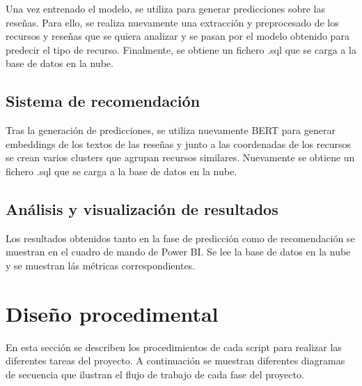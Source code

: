 Una vez entrenado el modelo, se utiliza para generar predicciones sobre las reseñas.
Para ello, se realiza nuevamente una extracción y preprocesado de los recursos y reseñas que se quiera analizar y se pasan por el modelo obtenido para predecir el tipo de recurso.
Finalmente, se obtiene un fichero .sql que se carga a la base de datos en la nube.

\subsection{Sistema de recomendación}

Tras la generación de predicciones, se utiliza nuevamente BERT para generar embeddings de los textos de las reseñas y junto a las coordenadas de los recursos se 
crean varios clusters que agrupan recursos similares.
Nuevamente se obtiene un fichero .sql que se carga a la base de datos en la nube.

\subsection{Análisis y visualización de resultados}

Los resultados obtenidos tanto en la fase de predicción como de recomendación se muestran en el cuadro de mando de Power BI.
Se lee la base de datos en la nube y se muestran lás métricas correspondientes.

\section{Diseño procedimental}

En esta sección se describen los procedimientos de cada script para realizar las diferentes tareas del proyecto.
A continuación se muestran diferentes diagramas de secuencia que ilustran el flujo de trabajo de cada fase del proyecto.

